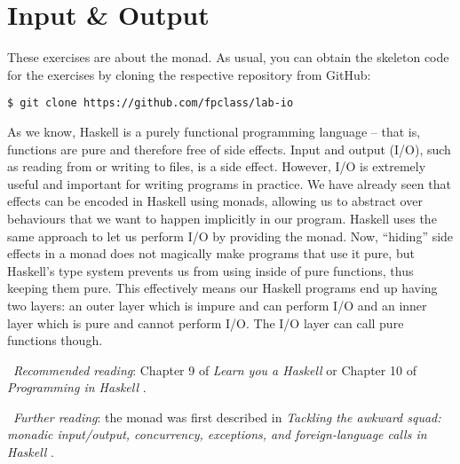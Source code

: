 \section{Input \& Output}

These exercises are about the  monad. As usual, you can obtain the skeleton code for the exercises by cloning the respective repository from GitHub:
\begin{verbatim}
$ git clone https://github.com/fpclass/lab-io
\end{verbatim}
As we know, Haskell is a purely functional programming language -- that is, functions are pure and therefore free of side effects. Input and output (I/O), such as reading from or writing to files, is a side effect. However, I/O is extremely useful and important for writing programs in practice. We have already seen that effects can be encoded in Haskell using monads, allowing us to abstract over behaviours that we want to happen implicitly in our program. Haskell uses the same approach to let us perform I/O by providing the  monad. Now, ``hiding'' side effects in a monad does not magically make programs that use it pure, but Haskell's type system prevents us from using  inside of pure functions, thus keeping them pure. This effectively means our Haskell programs end up having two layers: an outer layer which is impure and can perform I/O and an inner layer which is pure and cannot perform I/O. The I/O layer can call pure functions though.

\faBook~\emph{Recommended reading}: Chapter 9 of \emph{Learn you a Haskell} \citep{lipovaca2011learn} or Chapter 10 of \emph{Programming in Haskell} \citep{hutton2016programming}.

\faBook~\emph{Further reading}: the  monad was first described in \emph{Tackling the awkward squad: monadic input/output, concurrency, exceptions, and foreign-language calls in Haskell} \citep{jones2000tackling}.

\taskLine


